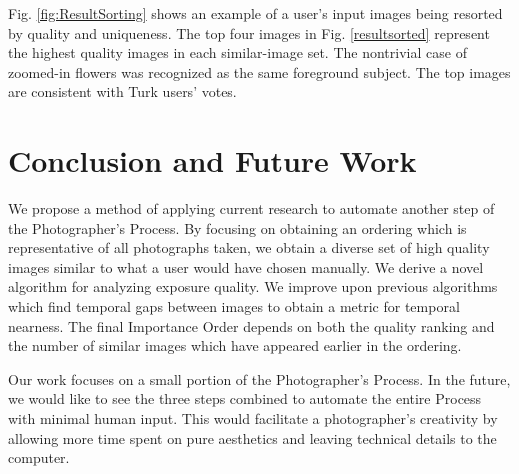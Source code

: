 \documentclass{sig-alternate}
\begin{document}
Fig. \ref{fig:ResultSorting} shows an example of a user's input images being resorted by quality and uniqueness. The top four images in Fig. \ref{resultsorted} represent the highest quality images in each similar-image set. The nontrivial case of zoomed-in flowers was recognized as the same foreground subject. The top images are consistent with Turk users' votes.


\section{Conclusion and Future Work}
We propose a method of applying current research to automate another step of the Photographer's Process. By focusing on obtaining an ordering which is representative of all photographs taken, we obtain a diverse set of high quality images similar to what a user would have chosen manually. We derive a novel algorithm for analyzing exposure quality. We improve upon previous algorithms which find temporal gaps between images to obtain a metric for temporal nearness. The final Importance Order depends on both the quality ranking and the number of similar images which have appeared earlier in the ordering.

Our work focuses on a small portion of the Photographer's Process. In the future, we would like to see the three steps combined to automate the entire Process with minimal human input. This would facilitate a photographer's creativity by allowing more time spent on pure aesthetics and leaving technical details to the computer.

{
 
 
}
\end{document}
